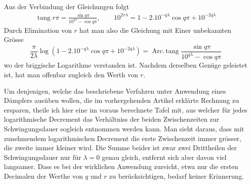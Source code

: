 Aus der Verbindung der Gleichungen folgt
\[
\begin{gathered}
\operatorname{tang}r\pi=\frac{\sin q\pi}{10^{q\lambda}-\cos q\pi},\qquad
10^{2r\lambda}=1-2.10^{-q\lambda}\cos q\pi+10^{-2q\lambda}
\end{gathered}
\]
Durch Elimination von $r$ hat man also die Gleichung mit Einer unbekannten Grösse
\[
\frac{\pi}{2\lambda}\log(1-2.10^{-q\lambda}\cos q\pi+10^{-2q\lambda})=\operatorname{Arc.\,tang}\frac{\sin q\pi}{10^{q\lambda}-\cos q\pi}
\]
wo der briggische Logarithme verstanden ist. Nachdem derselben Genüge geleistet ist, hat man offenbar zugleich den Werth von $r$.

Um denjenigen, welche das beschriebene Verfahren unter Anwendung eines Dämpfers ausüben wollen, die im vorhergehenden Artikel erklärte Rechnung zu ersparen, theile ich hier eine im voraus berechnete Tafel mit, aus welcher für jedes logarithmische Decrement das Verhältniss der beiden Zwischenzeiten zur Schwingungsdauer sogleich entnommen werden kann. Man sieht daraus, dass mit zunehmendem logarithmischen Decrement die erste Zwischenzeit immer grösser, die zweite immer kleiner wird. Die Summe beider ist zwar zwei Drittheilen der Schwingungsdauer nur für $\lambda=0$ genau gleich, entfernt sich aber davon viel langsamer. Dass es bei der wirklichen Anwendung zureicht, etwa nur die ersten Decimalen der Werthe von $q$ und $r$ zu berücksichtigen, bedarf keiner Erinnerung.

